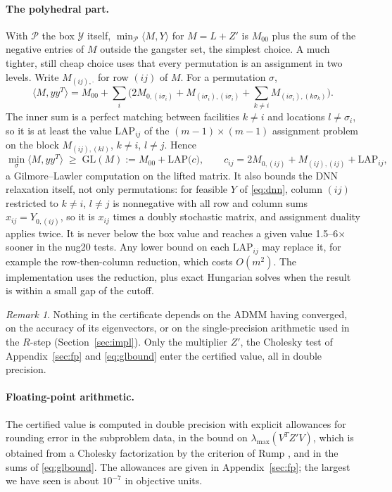\documentclass[11pt]{article}
\theoremstyle{remark}
\newtheorem{remark}[proposition]{Remark}
\newcommand{\inner}[2]{\langle #1, #2\rangle}
\newcommand{\lmax}{\lambda_{\max}}
\newcommand{\GL}{\mathrm{GL}}
\newcommand{\LAP}{\mathrm{LAP}}
\begin{document}
\paragraph{The polyhedral part.} With $\mathcal{P}$ the box $\mathcal{Y}$ itself,
$\min_{\mathcal{P}}\inner{M}{Y}$ for $M = L+Z'$ is $M_{00}$ plus the sum of the
negative entries of $M$ outside the gangster set, the simplest choice. A much
tighter, still cheap choice uses that every permutation is an assignment in two
levels. Write $M_{(ij),\cdot}$ for row $(ij)$ of $M$. For a permutation $\sigma$,
\begin{equation}\label{eq:gl}
\inner{M}{yy^T} = M_{00} + \sum_{i}\Big( 2M_{0,(i\sigma_i)} + M_{(i\sigma_i),(i\sigma_i)}
 + \sum_{k\ne i} M_{(i\sigma_i),(k\sigma_k)} \Big).
\end{equation}
The inner sum is a perfect matching between facilities $k\ne i$ and locations
$l\ne\sigma_i$, so it is at least the value $\LAP_{ij}$ of the $(m-1)\times(m-1)$
assignment problem on the block $M_{(ij),(kl)}$, $k\ne i$, $l\ne j$. Hence
\begin{equation}\label{eq:glbound}
\min_{\sigma}\inner{M}{yy^T} \;\ge\; \GL(M) := M_{00} + \LAP\big(c\big),\qquad
c_{ij} = 2M_{0,(ij)} + M_{(ij),(ij)} + \LAP_{ij},
\end{equation}
a Gilmore--Lawler computation \cite{gilmore,lawler} on the lifted matrix. It also
bounds the DNN relaxation itself, not only permutations: for feasible $Y$ of
\eqref{eq:dnn}, column $(ij)$ restricted to $k\ne i$, $l\ne j$ is nonnegative with
all row and column sums $x_{ij} = Y_{0,(ij)}$, so it is $x_{ij}$ times a doubly
stochastic matrix, and assignment duality applies twice. It is never below the box
value and reaches a given value 1.5--6$\times$ sooner in the nug20 tests. Any lower
bound on each $\LAP_{ij}$ may replace it, for example the row-then-column
reduction, which costs $O(m^2)$. The implementation uses the reduction, plus exact
Hungarian solves when the result is within a small gap of the cutoff.

\begin{remark}
Nothing in the certificate depends on the ADMM having converged, on the accuracy
of its eigenvectors, or on the single-precision arithmetic used in the $R$-step
(Section~\ref{sec:impl}). Only the multiplier $Z'$, the Cholesky test of Appendix~\ref{sec:fp} and
\eqref{eq:glbound} enter the certified value, all in double precision.
\end{remark}

\paragraph{Floating-point arithmetic.} The certified value is computed in
double precision with explicit allowances for rounding error in the subproblem
data, in the bound on $\lmax(V^TZ'V)$, which is obtained from a Cholesky
factorization by the criterion of Rump \cite{rump}, and in the sums of
\eqref{eq:glbound}. The allowances are given in Appendix~\ref{sec:fp}; the
largest we have seen is about $10^{-7}$ in objective units.
\end{document}
